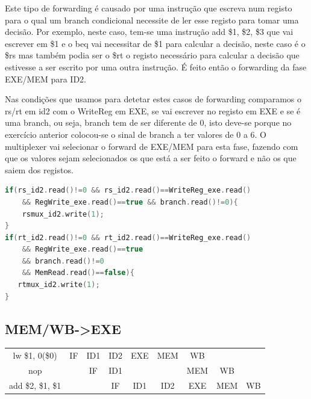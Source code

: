 \documentclass[pdftex,12pt,a4paper]{report}
\begin{document}
Este tipo de forwarding é causado por uma instrução que escreva num registo para o qual um branch condicional necessite de ler esse registo para tomar uma decisão. Por exemplo, neste caso, tem-se uma instrução add \$1, \$2, \$3 que vai escrever em \$1 e o beq vai necessitar de \$1 para calcular a decisão, neste caso é o \$rs mas também podia ser o \$rt o registo necessário para calcular a decisão que estivesse a ser escrito por uma outra instrução. É feito então o forwarding da fase EXE/MEM para ID2.

Nas condições que usamos para detetar estes casos de forwarding comparamos o rs/rt em id2 com o WriteReg em EXE, se vai escrever no registo em EXE e se é uma branch, ou seja, branch tem de ser diferente de 0, isto deve-se porque no exercício anterior colocou-se o sinal de branch a ter valores de 0 a 6. O multiplexer vai selecionar o forward de EXE/MEM para esta fase, fazendo com que os valores sejam selecionados os que está a ser feito o forward e não os que saiem dos registos.

\begin{lstlisting}[language=c]
if(rs_id2.read()!=0 && rs_id2.read()==WriteReg_exe.read() 
	&& RegWrite_exe.read()==true && branch.read()!=0){
    rsmux_id2.write(1);
}
if(rt_id2.read()!=0 && rt_id2.read()==WriteReg_exe.read() 
	&& RegWrite_exe.read()==true 
	&& branch.read()!=0 
	&& MemRead.read()==false){
   rtmux_id2.write(1);
}
\end{lstlisting} 


\subsection{MEM/WB->EXE}

\begin{table}[!htb]
\centering
\label{my-label}
\begin{tabular}{ccc|c|c|c|c|cc}
\cline{2-7}
\multicolumn{1}{c|}{lw \$1, 0(\$0)} & \multicolumn{1}{c|}{IF} & ID1 & ID2 & EXE                                                & \cellcolor[HTML]{F8A102}MEM                        & \cellcolor[HTML]{FFCC67}WB  &                          &                         \\ \cline{2-8}
nop                               & \multicolumn{1}{c|}{}   & IF  & ID1 & \cellcolor[HTML]{FFFFFF}{\color[HTML]{000000} ID2} & \cellcolor[HTML]{FFFFFF}{\color[HTML]{333333} EXE} & MEM                         & \multicolumn{1}{c|}{WB}  &                         \\ \cline{3-9} 
add \$2, \$1, \$1                   &                         &     & IF  & ID1                                                & ID2                                                & \cellcolor[HTML]{F8A102}EXE & \multicolumn{1}{c|}{MEM} & \multicolumn{1}{c|}{WB} \\ \cline{4-9} 
\end{tabular}
\end{table}
\end{document}
